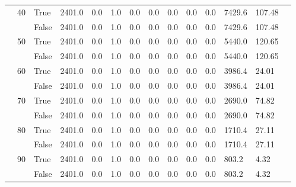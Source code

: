 \begin{landscape}
\begin{small}
\begin{longtable}[c]{@{}lll|ll|ll|ll|ll|lll@{}}
   & 40 & True  & 2401.0          & 0.0            & 1.0           & 0.0           & 0.0           & 0.0           & 0.0           & 0.0           & 7429.6        & 107.48      &  \\
   &    & False & 2401.0          & 0.0            & 1.0           & 0.0           & 0.0           & 0.0           & 0.0           & 0.0           & 7429.6        & 107.48      &  \\
   & 50 & True  & 2401.0          & 0.0            & 1.0           & 0.0           & 0.0           & 0.0           & 0.0           & 0.0           & 5440.0        & 120.65      &  \\
   &    & False & 2401.0          & 0.0            & 1.0           & 0.0           & 0.0           & 0.0           & 0.0           & 0.0           & 5440.0        & 120.65      &  \\
   & 60 & True  & 2401.0          & 0.0            & 1.0           & 0.0           & 0.0           & 0.0           & 0.0           & 0.0           & 3986.4        & 24.01       &  \\
   &    & False & 2401.0          & 0.0            & 1.0           & 0.0           & 0.0           & 0.0           & 0.0           & 0.0           & 3986.4        & 24.01       &  \\
   & 70 & True  & 2401.0          & 0.0            & 1.0           & 0.0           & 0.0           & 0.0           & 0.0           & 0.0           & 2690.0        & 74.82       &  \\
   &    & False & 2401.0          & 0.0            & 1.0           & 0.0           & 0.0           & 0.0           & 0.0           & 0.0           & 2690.0        & 74.82       &  \\
   & 80 & True  & 2401.0          & 0.0            & 1.0           & 0.0           & 0.0           & 0.0           & 0.0           & 0.0           & 1710.4        & 27.11       &  \\
   &    & False & 2401.0          & 0.0            & 1.0           & 0.0           & 0.0           & 0.0           & 0.0           & 0.0           & 1710.4        & 27.11       &  \\
   & 90 & True  & 2401.0          & 0.0            & 1.0           & 0.0           & 0.0           & 0.0           & 0.0           & 0.0           & 803.2         & 4.32        &  \\
   &    & False & 2401.0          & 0.0            & 1.0           & 0.0           & 0.0           & 0.0           & 0.0           & 0.0           & 803.2         & 4.32        &  \\

\end{longtable}
\end{small}
\end{landscape}
